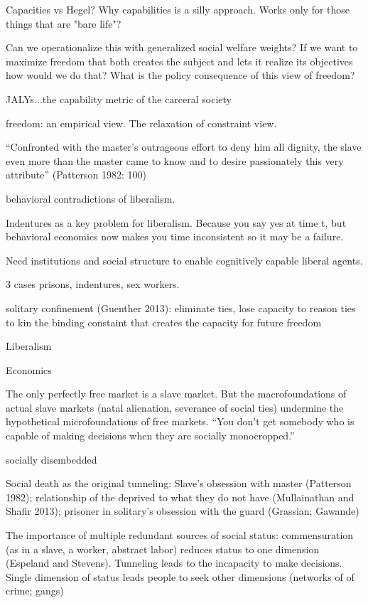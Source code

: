 \documentclass[10pt,a4paper]{article}
\begin{document}
Capacities vs Hegel? Why capabilities is a silly approach. Works only for those things that are "bare life"?

Can we operationalize this with generalized social welfare weights? If we want to maximize freedom that both creates the
subject and lets it realize its objectives how would we do that? What is the policy consequence of this view of freedom?

JALYs...the capability metric of the carceral society


freedom: an empirical view. The relaxation of constraint view.

``Confronted with the master's outrageous effort to deny him all dignity, the slave even more than the master came 
to know and to desire passionately this very attribute'' (Patterson 1982: 100)

behavioral contradictions of liberalism.

Indentures as a key problem for liberalism. Because you say yes at time t, but behavioral economics now makes you time inconsistent
so it may be a failure.

Need institutions and social structure to enable cognitively capable liberal agents.

3 cases
prisons, indentures, sex workers.

solitary confinement (Guenther 2013): eliminate ties, lose capacity to reason
ties to kin the binding constaint that creates the capacity for future freedom

Liberalism



Economics
 
 The only perfectly free market is a slave market. But the macrofoundations of actual slave markets 
 (natal alienation, severance of social ties) undermine the hypothetical microfoundations of free markets. 
 ``You don't get somebody who is capable of making decisions when they are socially monocropped.''
 
 socially disembedded
 
 Social death as the original tunneling: Slave's obsession with master (Patterson 1982); 
 relationship of the deprived to what they do not have (Mullainathan and Shafir 2013); prisoner 
 in solitary's obsession with the guard (Grassian; Gawande)
 
 The importance of multiple redundant sources of social status: commensuration (as in a slave, a worker, 
 abstract labor) reduces status to one dimension (Espeland and Stevens). Tunneling leads to the incapacity 
 to make decisions. Single dimension of status leads people to seek other dimensions (networks of 
 of crime; gangs) 
 
\end{document}

